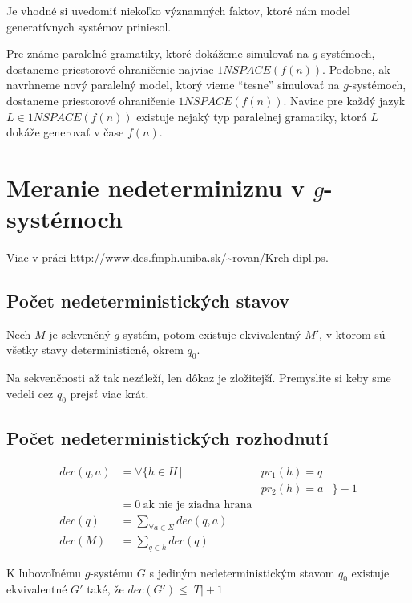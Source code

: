 Je vhodné si uvedomiť niekoľko významných faktov, ktoré nám model
generatívnych systémov priniesol.

Pre známe paralelné gramatiky, ktoré dokážeme simulovať na
$g$-systémoch, dostaneme priestorové ohraničenie najviac
$1NSPACE(f(n))$. Podobne, ak navrhneme nový paralelný model, ktorý
vieme ``tesne'' simulovať na $g$-systémoch, dostaneme priestorové
ohraničenie $1NSPACE(f(n))$. Naviac pre každý jazyk $L\in
1NSPACE(f(n))$ existuje nejaký typ paralelnej gramatiky, ktorá $L$
dokáže generovať v čase $f(n)$.


\section{Meranie nedeterminiznu v $g$-systémoch}
\begin{poznamka}
Viac v práci \url{http://www.dcs.fmph.uniba.sk/~rovan/Krch-dipl.ps}.
\end{poznamka}
\subsection{Počet nedeterministických stavov}
\begin{veta}
Nech $M$ je sekvenčný $g$-systém, potom existuje ekvivalentný $M'$,
v ktorom sú všetky stavy deterministicné, okrem $q_0$.
\end{veta}
\begin{poznamka}
Na sekvenčnosti až tak nezáleží, len dôkaz je zložitejší.
Premyslite si keby sme vedeli cez $q_0$ prejsť viac krát.
\end{poznamka}

\subsection{Počet nedeterministických rozhodnutí}

$$
\begin{aligned}
dec(q, a) &= \forall \{  h \in H \,|\,  &pr_1(h) = q\\
                                   &&pr_2(h) = a& \} - 1\\
          &= 0~\text{ak nie je ziadna hrana} \\
dec(q)    &= \sum_{\forall a \in \Sigma} dec(q, a)\\
dec(M)    &= \sum_{q \in k} dec(q)
\end{aligned}
$$ 

\begin{veta}
K ľubovoľnému $g$-systému $G$ s jediným nedeterministickým stavom $q_0$
existuje ekvivalentné $G'$ také, že $dec(G') \leq |T| + 1$
\end{veta}


